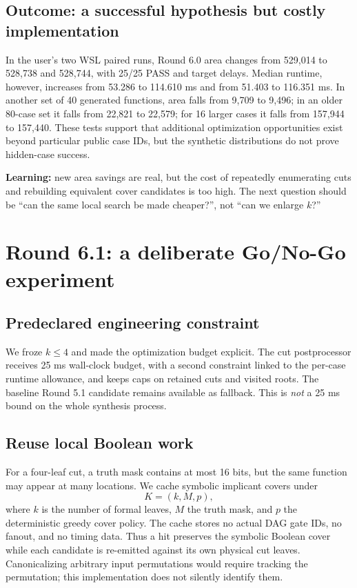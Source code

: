 \documentclass[a4paper,10pt]{article}
\theoremstyle{definition}
\theoremstyle{remark}
\begin{document}
\subsection{Outcome: a successful hypothesis but costly implementation}
In the user's two WSL paired runs, Round 6.0 area changes from 529,014 to 528,738 and 528,744, with 25/25 PASS and target delays. Median runtime, however, increases from 53.286 to 114.610 ms and from 51.403 to 116.351 ms. In another set of 40 generated functions, area falls from 9,709 to 9,496; in an older 80-case set it falls from 22,821 to 22,579; for 16 larger cases it falls from 157,944 to 157,440. These tests support that additional optimization opportunities exist beyond particular public case IDs, but the synthetic distributions do not prove hidden-case success.

\begin{tcolorbox}[colback=ResearchPeach!30,colframe=ResearchRose,title=Decision after Round 6.0]
\textbf{Learning:} new area savings are real, but the cost of repeatedly enumerating cuts and rebuilding equivalent cover candidates is too high. The next question should be ``can the same local search be made cheaper?'', not ``can we enlarge $k$?''
\end{tcolorbox}

\section{Round 6.1: a deliberate Go/No-Go experiment}
\subsection{Predeclared engineering constraint}
We froze $k\le4$ and made the optimization budget explicit. The cut postprocessor receives 25 ms wall-clock budget, with a second constraint linked to the per-case runtime allowance, and keeps caps on retained cuts and visited roots. The baseline Round 5.1 candidate remains available as fallback. This is \emph{not} a 25 ms bound on the whole synthesis process.

\subsection{Reuse local Boolean work}
For a four-leaf cut, a truth mask contains at most 16 bits, but the same function may appear at many locations. We cache symbolic implicant covers under
\begin{equation}
 K=(k,M,p),
\end{equation}
where $k$ is the number of formal leaves, $M$ the truth mask, and $p$ the deterministic greedy cover policy. The cache stores no actual DAG gate IDs, no fanout, and no timing data. Thus a hit preserves the symbolic Boolean cover while each candidate is re-emitted against its own physical cut leaves. Canonicalizing arbitrary input permutations would require tracking the permutation; this implementation does not silently identify them.
\end{document}
